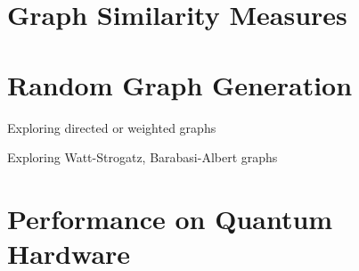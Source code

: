 \section{Graph Similarity Measures}

\section{Random Graph Generation}
Exploring directed or weighted graphs

Exploring Watt-Strogatz, Barabasi-Albert graphs

\section{Performance on Quantum Hardware}

